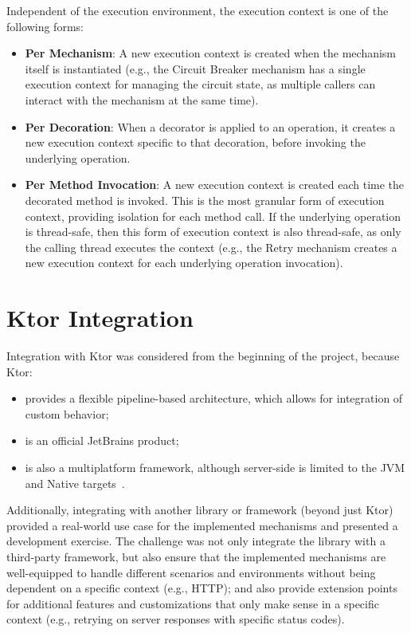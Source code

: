 Independent of the execution environment, the execution context is one of the following forms:

\begin{itemize}
    \item \textbf{Per Mechanism}: A new execution context is created when the mechanism itself is instantiated (e.g., the Circuit Breaker mechanism has a single execution context for managing the circuit state, as multiple callers can interact with the mechanism at the same time).
    \item \textbf{Per Decoration}: When a decorator is applied to an operation, it creates a new execution context specific to that decoration, before invoking the underlying operation.
    \item \textbf{Per Method Invocation}: A new execution context is created each time the decorated method is invoked.
    This is the most granular form of execution context, providing isolation for each method call.
    If the underlying operation is thread-safe, then this form of execution context is also thread-safe, as only the calling thread executes the context (e.g., the Retry mechanism creates a new execution context for each underlying operation invocation).
\end{itemize}


\section{Ktor Integration}\label{sec:ktor-integration}

Integration with Ktor was considered from the beginning of the project, because Ktor:
\begin{itemize}
    \item provides a flexible pipeline-based architecture, which allows for integration of custom behavior;
    \item is an official JetBrains product;
    \item is also a multiplatform framework, although server-side is limited to the JVM and Native targets~\cite{ktor-server-platforms}.
\end{itemize}

Additionally, integrating with another library or framework (beyond just Ktor) provided a real-world use case for the implemented mechanisms and presented a development exercise.
The challenge was not only integrate the library with a third-party framework, but also ensure that the implemented mechanisms are well-equipped to handle different scenarios and environments without being dependent on a specific context (e.g., HTTP); and also provide extension points for additional features and customizations that only make sense in a specific context (e.g., retrying on server responses with specific status codes).


